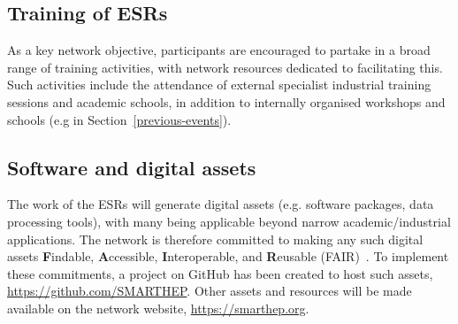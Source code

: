 \subsection{Training of ESRs}
\label{training}
As a key network objective, participants are encouraged to partake in a broad range of training activities, with network resources dedicated to facilitating this. Such activities include the attendance of external specialist industrial training sessions and academic schools, in addition to internally organised workshops and schools (e.g in Section~\ref{previous-events}).

\subsection{Software and digital assets}
\label{software}
The work of the ESRs will generate digital assets (e.g. software packages, data processing tools), with many being applicable beyond narrow academic/industrial applications. The network is therefore committed to making any such digital assets \textbf{F}indable, \textbf{A}ccessible, \textbf{I}nteroperable, and \textbf{R}eusable (FAIR)~\cite{FAIR-principles}. To implement these commitments, a project on GitHub has been created to host such assets, \url{https://github.com/SMARTHEP}. Other assets and resources will be made available on the network website, \url{https://smarthep.org}.